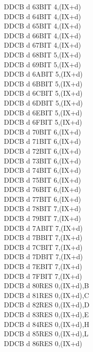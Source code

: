 \documentclass[12pt,twoside,openright,a4paper]{book}
\begin{document}
\begin{multicols}{3}
{\begin{tabbing}
	DDCB d 63\>BIT 4,(IX+d)\UNDOC\\
	DDCB d 64\>BIT 4,(IX+d)\UNDOC\\
	DDCB d 65\>BIT 4,(IX+d)\UNDOC\\
	DDCB d 66\>BIT 4,(IX+d)\\
	DDCB d 67\>BIT 4,(IX+d)\UNDOC\\
	DDCB d 68\>BIT 5,(IX+d)\UNDOC\\
	DDCB d 69\>BIT 5,(IX+d)\UNDOC\\
	DDCB d 6A\>BIT 5,(IX+d)\UNDOC\\
	DDCB d 6B\>BIT 5,(IX+d)\UNDOC\\
	DDCB d 6C\>BIT 5,(IX+d)\UNDOC\\
	DDCB d 6D\>BIT 5,(IX+d)\UNDOC\\
	DDCB d 6E\>BIT 5,(IX+d)\\
	DDCB d 6F\>BIT 5,(IX+d)\UNDOC\\
	DDCB d 70\>BIT 6,(IX+d)\UNDOC\\
	DDCB d 71\>BIT 6,(IX+d)\UNDOC\\
	DDCB d 72\>BIT 6,(IX+d)\UNDOC\\
	DDCB d 73\>BIT 6,(IX+d)\UNDOC\\
	DDCB d 74\>BIT 6,(IX+d)\UNDOC\\
	DDCB d 75\>BIT 6,(IX+d)\UNDOC\\
	DDCB d 76\>BIT 6,(IX+d)\\
	DDCB d 77\>BIT 6,(IX+d)\UNDOC\\
	DDCB d 78\>BIT 7,(IX+d)\UNDOC\\
	DDCB d 79\>BIT 7,(IX+d)\UNDOC\\
	DDCB d 7A\>BIT 7,(IX+d)\UNDOC\\
	DDCB d 7B\>BIT 7,(IX+d)\UNDOC\\
	DDCB d 7C\>BIT 7,(IX+d)\UNDOC\\
	DDCB d 7D\>BIT 7,(IX+d)\UNDOC\\
	DDCB d 7E\>BIT 7,(IX+d)\\
	DDCB d 7F\>BIT 7,(IX+d)\UNDOC\\
	DDCB d 80\>RES 0,(IX+d),B\UNDOC\\
	DDCB d 81\>RES 0,(IX+d),C\UNDOC\\
	DDCB d 82\>RES 0,(IX+d),D\UNDOC\\
	DDCB d 83\>RES 0,(IX+d),E\UNDOC\\
	DDCB d 84\>RES 0,(IX+d),H\UNDOC\\
	DDCB d 85\>RES 0,(IX+d),L\UNDOC\\
	DDCB d 86\>RES 0,(IX+d)\\

\end{tabbing}}
\end{multicols}
\end{document}
